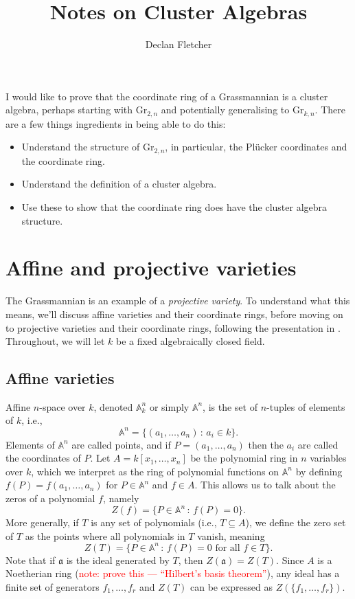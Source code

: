 \documentclass[12pt]{amsart}
\title{Notes on Cluster Algebras}
\author{Declan Fletcher}
\date{}
\newcommand{\An}{\mathbb{A}^n}
\theoremstyle{remark}
\theoremstyle{remark}
\begin{document}
\maketitle

\tableofcontents

I would like to prove that the coordinate ring of a Grassmannian is a cluster algebra, perhaps starting with $\mathrm{Gr}_{2, n}$ and potentially generalising to $\mathrm{Gr}_{k, n}$.
There are a few things ingredients in being able to do this:
\begin{itemize}
	\item
	Understand the structure of $\mathrm{Gr}_{2, n}$, in particular, the Pl\"{u}cker coordinates and the coordinate ring.
	
	\item
	Understand the definition of a cluster algebra.
	
	\item
	Use these to show that the coordinate ring does have the cluster algebra structure.
\end{itemize}

\section{Affine and projective varieties}
The Grassmannian is an example of a \emph{projective variety}.
To understand what this means, we'll discuss affine varieties and their coordinate rings, before moving on to projective varieties and their coordinate rings, following the presentation in \cite[\S1.1-1.2]{Hartshorne77}.
Throughout, we will let $k$ be a fixed algebraically closed field.

\subsection{Affine varieties}
Affine $n$-space over $k$, denoted $\An_k$ or simply $\An$, is the set of $n$-tuples of elements of $k$, i.e.,
$$\An = \{(a_1, \dots, a_n) \, : \, a_i \in k\}.$$
Elements of $\An$ are called points, and if $P = (a_1, \dots, a_n)$ then the $a_i$ are called the coordinates of $P$.
Let $A = k[x_1, \dots, x_n]$ be the polynomial ring in $n$ variables over $k$, which we interpret as the ring of polynomial functions on $\An$ by defining $f(P) = f(a_1, \dots, a_n)$ for $P \in \An$ and $f \in A$.
This allows us to talk about the zeros of a polynomial $f$, namely 
$$Z(f) = \{P \in \An \, : \, f(P) = 0\}.$$
More generally, if $T$ is any set of polynomials (i.e., $T \subseteq A$), we define the zero set of $T$ as the points where all polynomials in $T$ vanish, meaning 
$$Z(T) = \{P \in \An \, : \, f(P) = 0 \text{ for all } f \in T\}.$$
Note that if $\mathfrak{a}$ is the ideal generated by $T$, then $Z(\mathfrak{a}) = Z(T)$. 
Since $A$ is a Noetherian ring (\textcolor{red}{note: prove this  --- ``Hilbert's basis theorem''}), any ideal has a finite set of generators $f_1, \dots, f_r$ and $Z(T)$ can be expressed as $Z(\{f_1, \dots, f_r\})$.
\end{document}
